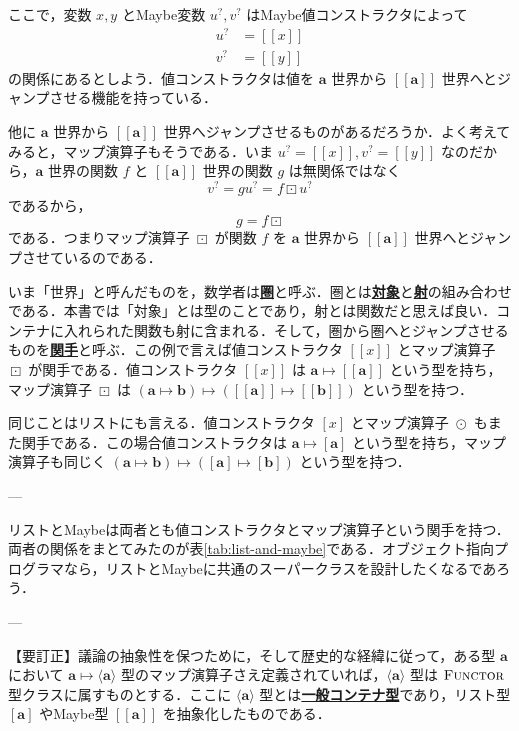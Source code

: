 \documentclass[a4paper,twocolumn]{jsbook}
\def\[{\left[\!\left[}
\def\]{\right]\!\right]}
\newcommand{\keyword}[1]{{\underline{\textbf{#1}}}}
\DeclareMathOperator{\mMapList}{\odot}
\DeclareMathOperator{\mMapMaybe}{\boxdot}
\DeclareMathOperator{\mMapsTo}{\mapsto}
\newcommand{\mType}[1]{\mathbf{#1}}
\newcommand{\mListWith}[1]{\left[#1\right]}
\newcommand{\mMaybeWith}[1]{\[#1\]}
\newcommand{\mPureWith}[1]{\langle#1\rangle}
\newcommand{\mListType}[1]{\mListWith{\mType{#1}}}
\newcommand{\mMaybeType}[1]{\mMaybeWith{\mType{#1}}}
\newcommand{\mPureType}[1]{\mPureWith{\mType{#1}}}
\newcommand{\mSpecialTypeClass}[1]{\textsc{#1}} %
\newcommand{\mFunctorTypeClass}{\mSpecialTypeClass{Functor}}
\newcommand{\mMaybe}[1]{{#1}^\text{?}}
\newcommand{\mProj}[2]{#1\mMapsTo#2}
\begin{document}
ここで，変数 $x,y$ とMaybe変数 $\mMaybe{u},\mMaybe{v}$ はMaybe値コンストラクタによって
\begin{align}
\mMaybe{u}&=\mMaybeWith{x}\\
\mMaybe{v}&=\mMaybeWith{y}
\end{align}
の関係にあるとしよう．値コンストラクタは値を $\mType{a}$ 世界から $\mMaybeType{a}$ 世界へとジャンプさせる機能を持っている．

他に $\mType{a}$ 世界から $\mMaybeType{a}$ 世界へジャンプさせるものがあるだろうか．よく考えてみると，マップ演算子もそうである．いま $\mMaybe{u}=\mMaybeWith{x},\mMaybe{v}=\mMaybeWith{y}$ なのだから，$\mType{a}$ 世界の関数 $f$ と $\mMaybeType{a}$ 世界の関数 $g$ は無関係ではなく
\begin{equation}
\mMaybe{v}=g\mMaybe{u}=f\mMapMaybe\mMaybe{u}
\end{equation}
であるから，
\begin{equation}
g=f\mMapMaybe
\end{equation}
である．つまりマップ演算子 $\mMapMaybe$ が関数 $f$ を $\mType{a}$ 世界から $\mMaybeType{a}$ 世界へとジャンプさせているのである．

いま「世界」と呼んだものを，数学者は\keyword{圏}と呼ぶ．圏とは\keyword{対象}と\keyword{射}の組み合わせである．本書では「対象」とは型のことであり，射とは関数だと思えば良い．コンテナに入れられた関数も射に含まれる．そして，圏から圏へとジャンプさせるものを\keyword{関手}と呼ぶ．この例で言えば値コンストラクタ $\mMaybeWith{x}$ とマップ演算子 $\mMapMaybe$ が関手である．値コンストラクタ $\mMaybeWith{x}$ は $\mProj{\mType{a}}{\mMaybeType{a}}$ という型を持ち，マップ演算子 $\mMapMaybe$ は $\mProj{(\mProj{\mType{a}}{\mType{b}})}{(\mProj{\mMaybeType{a}}{\mMaybeType{b}})}$ という型を持つ．

同じことはリストにも言える．値コンストラクタ $\mListWith{x}$ とマップ演算子 $\mMapList$ もまた関手である．この場合値コンストラクタは $\mProj{\mType{a}}{\mListType{a}}$ という型を持ち，マップ演算子も同じく $\mProj{(\mProj{\mType{a}}{\mType{b}})}{(\mProj{\mListType{a}}{\mListType{b}})}$ という型を持つ．

---

リストとMaybeは両者とも値コンストラクタとマップ演算子という関手を持つ．両者の関係をまとてみたのが表\ref{tab:list-and-maybe}である．オブジェクト指向プログラマなら，リストとMaybeに共通のスーパークラスを設計したくなるであろう．

---

【要訂正】議論の抽象性を保つために，そして歴史的な経緯に従って，ある型 $\mType{a}$ において $\mProj{\mType{a}}{\mPureType{a}}$ 型のマップ演算子さえ定義されていれば，$\mPureType{a}$ 型は $\mFunctorTypeClass$ 型クラスに属すものとする．ここに $\mPureType{a}$ 型とは\keyword{一般コンテナ型}であり，リスト型 $\mListType{a}$ やMaybe型 $\mMaybeType{a}$ を抽象化したものである． 
\end{document}

